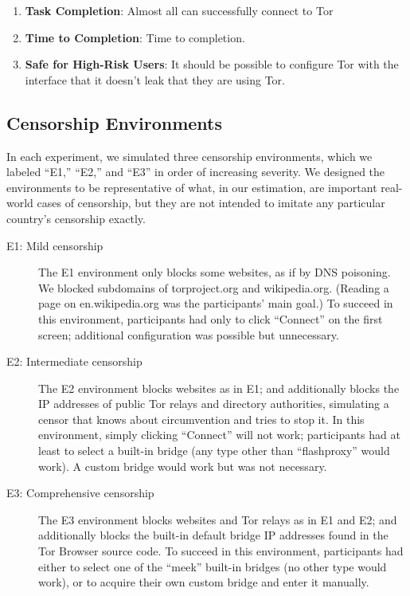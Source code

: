 \documentclass[USenglish,oneside,twocolumn]{article}
\begin{document}
\begin{enumerate}
    \item {\bfseries Task Completion}: Almost all can successfully connect to Tor
    \item {\bfseries  Time to Completion}: Time to completion. 
    \item {\bfseries Safe for High-Risk Users}: It should be possible to configure Tor with the interface that it doesn't leak that they are using Tor. 
\end{enumerate}

\subsection{Censorship Environments}
\label{sec:environments}
In each experiment, we simulated three censorship environments,
which we labeled ``E1,'' ``E2,'' and ``E3''
in order of increasing severity.
We designed the environments to be representative
of what, in our estimation, are important real-world
cases of censorship, but they are not intended to imitate
any particular country's censorship exactly.

\smallskip

\begin{description}
\item[E1: Mild censorship]
The E1 environment only blocks some websites,
as if by DNS poisoning.
We blocked subdomains of torproject.org
and wikipedia.org.
(Reading a page on en.wikipedia.org was the participants' main goal.)
To succeed in this environment,
participants had only to click ``Connect'' on the first screen;
additional configuration was possible but unnecessary.

\item[E2: Intermediate censorship]
The E2 environment blocks websites as in E1;
and additionally blocks the IP addresses of public Tor relays
and directory authorities, simulating a censor that knows
about circumvention and tries to stop it.
In this environment, simply clicking ``Connect'' will not work;
participants had at least to select a built-in bridge
(any type other than ``flashproxy'' would work).
A custom bridge would work but was not necessary.

\item[E3: Comprehensive censorship]
The E3 environment blocks websites and Tor relays as in E1 and E2;
and additionally blocks the built-in default bridge IP addresses
found in the Tor Browser source code.
To succeed in this environment, participants had either to select
one of the ``meek'' built-in bridges (no other type would work),
or to acquire their own custom bridge and enter it manually.
\end{description}
\end{document}
